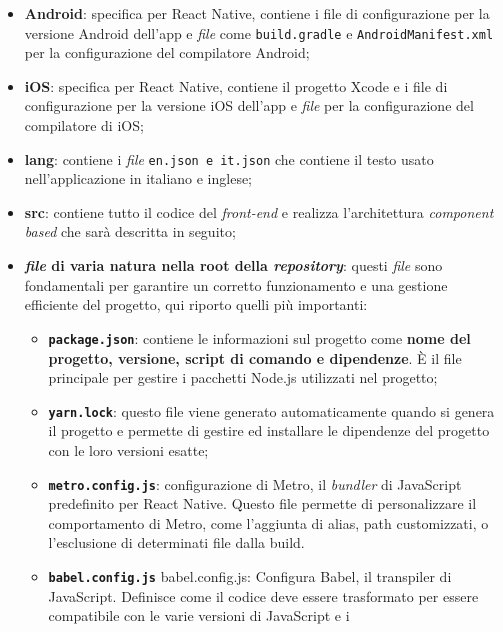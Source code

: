 \begin{itemize}
    \item \textbf{Android}: specifica per React Native, contiene i file di configurazione 
          per la versione Android dell'app e \textit{file} come \texttt{build.gradle} e \texttt{AndroidManifest.xml} 
          per la configurazione del compilatore Android;
    \item \textbf{iOS}: specifica per React Native, contiene il progetto Xcode e i file di configurazione 
          per la versione iOS dell'app e \textit{file} per la configurazione del compilatore di iOS;
    \item \textbf{lang}: contiene i \textit{file} \texttt{en.json e it.json} che contiene il testo usato nell'applicazione 
          in italiano e inglese;
    \item \textbf{src}: contiene tutto il codice del \textit{front-end} e realizza l'architettura \textit{component 
          based} che sarà descritta in seguito;
    \item \textbf{\textit{file} di varia natura nella root della \textit{repository}}: questi \textit{file} sono fondamentali 
          per garantire un corretto funzionamento e una gestione efficiente del progetto, qui riporto quelli più importanti:
          \begin{itemize}
            \item \textbf{\texttt{package.json}}: contiene le informazioni sul progetto come \textbf{nome del progetto, versione,
                  script di comando e dipendenze}. È il file principale per gestire i pacchetti Node.js utilizzati nel progetto;
            \item \textbf{\texttt{yarn.lock}}: questo file viene generato automaticamente quando si genera il progetto e 
                  permette di gestire ed installare le dipendenze del progetto con le loro versioni esatte;
            \item \textbf{\texttt{metro.config.js}}: configurazione di Metro, il \textit{bundler} di JavaScript predefinito 
                  per React Native. Questo file permette di personalizzare il comportamento di Metro, come 
                  l'aggiunta di alias, path customizzati, o l'esclusione di determinati file dalla build.
            \item \textbf{\texttt{babel.config.js}} babel.config.js: Configura Babel, il transpiler di JavaScript. 
                  Definisce come il codice deve essere trasformato per essere compatibile con le varie versioni di JavaScript e i 

\end{itemize}
\end{itemize}
